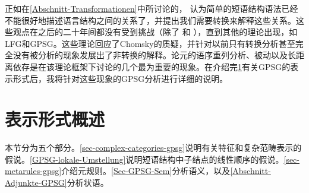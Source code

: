 正如在\ref{Abschnitt-Transformationen}中所讨论的， \citet{Chomsky57a}认为简单的短语结构语法已经不能很好地描述语言结构之间的关系了，并提出我们需要转换来解释这些关系。这些观点在之后的二十年间都没有受到挑战（除了 和 ），直到其他的理论出现，如LFG和GPSG。这些理论回应了Chomsky的质疑，并针对以前只有转换分析甚至完全没有被分析的现象发展出了非转换的解释。论元的语序重列分析、被动以及长距离依存是在该理论框架下讨论的几个最为重要的现象。在介绍完\ref{sec-Representationsformat}有关GPSG的表示形式后，我将针对这些现象的GPSG分析进行详细的说明。


\section{表示形式概述}
\label{sec-Representationsformat}

本节分为五个部分。\ref{sec-complex-categories-gpsg}说明有关特征和复杂范畴表示的假说。\ref{GPSG-lokale-Umstellung}说明短语结构中子结点的线性顺序的假说。\ref{sec-metarules-gpsg}介绍元规则。\ref{Sec-GPSG-Sem}分析语义，以及\ref{Abschnitt-Adjunkte-GPSG}分析状语。

